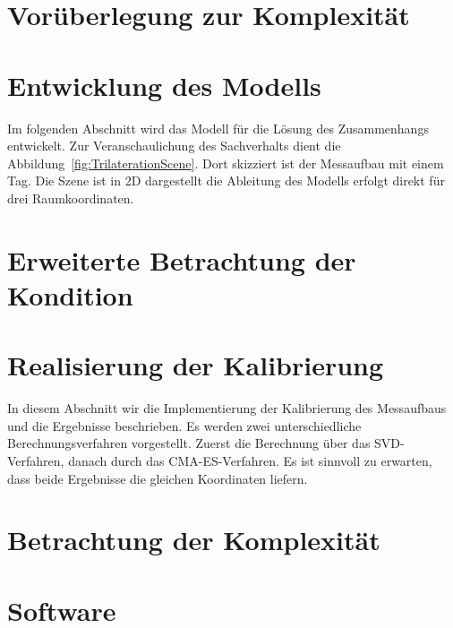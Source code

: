 \section{Vorüberlegung zur Komplexität}
\label{sec:Komplexity1}

%
\section{Entwicklung des Modells}
\label{sec:model_developement}
Im folgenden Abschnitt wird das Modell für die Lösung des Zusammenhangs entwickelt. Zur Veranschaulichung des Sachverhalts dient die Abbildung~\ref{fig:TrilaterationScene}. Dort skizziert ist der Messaufbau mit einem Tag. Die Szene ist in 2D dargestellt die Ableitung des Modells erfolgt direkt für drei Raumkoordinaten.
%

%

\section{Erweiterte Betrachtung der Kondition}

%
\section{Realisierung der Kalibrierung}
\label{sec:calibration}
In diesem Abschnitt wir die Implementierung der Kalibrierung des Messaufbaus und die Ergebnisse beschrieben. Es werden zwei unterschiedliche Berechnungsverfahren vorgestellt. Zuerst die Berechnung über das SVD-Verfahren, danach durch das CMA-ES-Verfahren. Es ist sinnvoll zu erwarten, dass beide Ergebnisse die gleichen Koordinaten liefern.
%

%
%
\section{Betrachtung der Komplexität}
\label{sec:Komplexity2}


\section{Software}
\label{sec:sw}

\lipsum[1-3]


